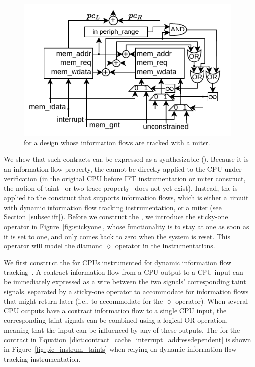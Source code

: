 \begin{figure}
    \begin{center}
    \includegraphics[width=1\columnwidth]{figures/picinstrum_miter/picinstrum_miter.pdf}
    \end{center}
    \vspace*{-1em}
    \caption{\Pici for a design whose information flows are tracked with a miter. }
    \label{fig:pic_instrum_miter}
    \vspace*{-.4em}
\end{figure}

We show that such contracts can be expressed as a synthesizable \pici (\PICI).
Because it is an information flow property, the \PICI cannot be directly applied to the CPU under verification (in the original CPU before IFT instrumentation or miter construct, the notion of taint~\cite{solt2022cellift,ceesay2024mucfi} or two-trace property~\cite{wang2023specification,dinesh2024conjunct,dinesh2024conjunct,tan2025contractshadowlogic} does not yet exist).
Instead, the \PICI is applied to the construct that supports information flows, which is either a circuit with dynamic information flow tracking instrumentation, or a miter (see Section~\ref{subsec:ift}).
Before we construct the \PICI, we introduce the sticky-one operator in Figure~\ref{fig:stickyone}, whose functionality is to stay at one as soon as it is set to one, and only comes back to zero when the system is reset.
This operator will model the diamond $\lozenge$ operator in the instrumentations.

We first construct the \PICI for CPUs instrumented for dynamic information flow tracking~\cite{tiwari2009complete,solt2022cellift}.
A contract information flow from a CPU output to a CPU input can be immediately expressed as a wire between the two signals' corresponding taint signals, separated by a sticky-one operator to accommodate for information flows that might return later (i.e., to accommodate for the $\lozenge$ operator).
When several CPU outputs have a contract information flow to a single CPU input, the corresponding taint signals can be combined using a logical OR operation, meaning that the input can be influenced by any of these outputs.
The \PICI for the contract in Equation~\ref{dict:contract_cache_interrupt_addressdependent} is shown in Figure~\ref{fig:pic_instrum_taints} when relying on dynamic information flow tracking instrumentation.

